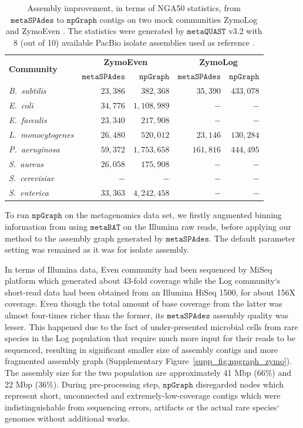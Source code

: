 \documentclass[10pt,twocolumn,twoside]{genpaper}
\newcommand{\npgraph}{$\mathtt{npGraph}$}
\begin{document}
\begin{table}[!hpt]
\begin{center}
\caption{Assembly improvement, in terms of NGA50 statistics, from $\mathtt{metaSPAdes}$ to \npgraph{} contigs on two mock communities ZymoLog and ZymoEven \cite{Nick2019zymo}. The statistics were generated by $\mathtt{metaQUAST}$ v3.2 with 8 (out of 10) available PacBio isolate assemblies used as reference \cite{Mcintyre2019zymo}.}
\label{table:zymo}
\begin{tabular}{|l|r|r|r|r|}
\hline
\multirow{2}{*}{\textbf{Community}} & \multicolumn{2}{|c|}{\textbf{ZymoEven}} & \multicolumn{2}{|c|}{\textbf{ZymoLog}} \\ \cline{2-5}
& $\mathtt{metaSPAdes}$ & \npgraph{} & $\mathtt{metaSPAdes}$ & \npgraph{} \\ \hline
\emph{B.~subtilis} & $23,386$ & $382,368$ & $35,390$ & $433,078$ \\ \hline
\emph{E.~coli} & $34,776$ & $1,108,989$ & $-$ & $-$ \\ \hline
\emph{E.~faecalis} & $23,340$ & $217,908$ & $-$ & $-$ \\ \hline
\emph{L.~monocytogenes} & $26,480$ & $520,012$ & $23,146$ & $130,284$ \\ \hline
\emph{P.~aeruginosa} & $59,372$ & $1,753,658$ & $161,816$ & $444,495$ \\ \hline
\emph{S.~aureus} & $26,058$ & $175,908$ & $-$ &$-$ \\ \hline
\emph{S.~cerevisiae} & $-$ & $-$ & $-$ & $-$ \\ \hline
\emph{S.~enterica} & $33,363$ & $4,242,458$ & $-$ & $-$ \\ \hline
\end{tabular}
\end{center}
\end{table}

To run \npgraph{} on the metagenomics data set, we firstly augmented binning information from using $\mathtt{metaBAT}$ \cite{Kang2015metabat} on the Illumina raw reads, before applying our method to the assembly graph generated by $\mathtt{metaSPAdes}$. The default parameter setting was remained as it was for isolate assembly. 

In terms of Illumina data, Even community had been sequenced by MiSeq platform which generated about 43-fold coverage while the Log community`s short-read data had been obtained from an Illumina HiSeq 1500, for about 156X coverage.
Even though the total amount of base coverage from the latter was almost four-times richer than the former, its $\mathtt{metaSPAdes}$ assembly quality was lesser. This happened due to the fact of under-presented microbial cells from rare species in the Log population that require much more input for their reads to be sequenced, resulting in significant smaller size of assembly contigs and more fragmented assembly graph (Supplementary Figure~\ref{supp_fig:npgraph_zymo}).
The assembly size for the two population are approximately 41 Mbp (66\%) and 22 Mbp (36\%). 
During pre-processing step, \npgraph{} disregarded nodes which represent short, unconnected and extremely-low-coverage contigs which were indistinguishable from sequencing errors, artifacts or the actual rare species` genomes without additional works.
\end{document}
